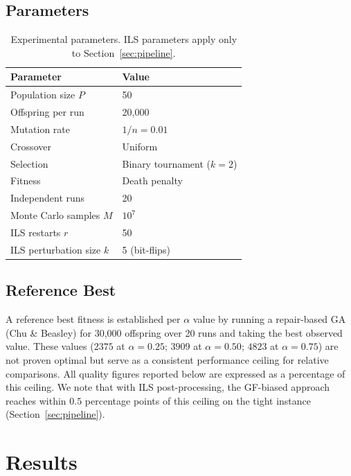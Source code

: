 \documentclass[twocolumn]{article}
\begin{document}
\subsection{Parameters}

\begin{table}[H]
\centering
\begin{tabular}{ll}
\toprule
Parameter & Value \\
\midrule
Population size $P$ & 50 \\
Offspring per run & 20,000 \\
Mutation rate & $1/n = 0.01$ \\
Crossover & Uniform \\
Selection & Binary tournament ($k=2$) \\
Fitness & Death penalty \\
Independent runs & 20 \\
Monte Carlo samples $M$ & $10^7$ \\
ILS restarts $r$ & 50 \\
ILS perturbation size $k$ & 5 (bit-flips) \\
\bottomrule
\end{tabular}
\caption{Experimental parameters. ILS parameters apply only to 
Section~\ref{sec:pipeline}.}
\end{table}

\subsection{Reference Best}

A reference best fitness is established per $\alpha$ value by running 
a repair-based GA (Chu \& Beasley) for 30,000 offspring over 20 runs 
and taking the best observed value. These values ($2375$ at $\alpha = 0.25$; 
$3909$ at $\alpha = 0.50$; $4823$ at $\alpha = 0.75$) are not proven 
optimal but serve as a consistent performance ceiling for relative 
comparisons. All quality figures reported below are expressed as a 
percentage of this ceiling. We note that with ILS post-processing, the 
GF-biased approach reaches within $0.5$ percentage points of this 
ceiling on the tight instance (Section~\ref{sec:pipeline}).

\section{Results}
\label{sec:results}
\end{document}
